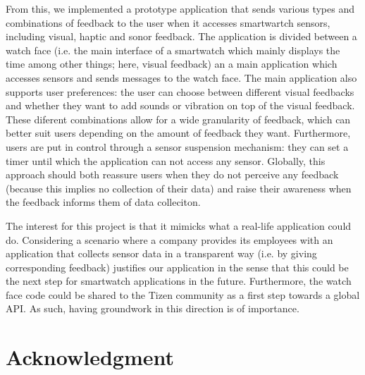 \documentclass[conference, a4paper, 10pt, twocolumn]{IEEEtran}
\begin{document}
From this, we implemented a prototype application that sends various types and combinations of feedback to the user when it accesses smartwartch sensors, including visual, haptic and sonor feedback. The application is divided between a watch face (i.e. the main interface of a smartwatch which mainly displays the time among other things; here, visual feedback) an a main application which accesses sensors and sends messages to the watch face. The main application also supports user preferences: the user can choose between different visual feedbacks and whether they want to add sounds or vibration on top of the visual feedback. These diferent combinations allow for a wide granularity of feedback, which can better suit users depending on the amount of feedback they want. Furthermore, users are put in control through a sensor suspension mechanism: they can set a timer until which the application can not access any sensor. Globally, this approach should both reassure users when they do not perceive any feedback (because this implies no collection of their data) and raise their awareness when the feedback informs them of data colleciton.  

The interest for this project is that it mimicks what a real-life application could do. Considering a scenario where a company provides its employees with an application that collects sensor data in a transparent way (i.e. by giving corresponding feedback) justifies our application in the sense that this could be the next step for smartwatch applications in the future. Furthermore, the watch face code could be shared to the Tizen community as a first step towards a global \ac{API}. As such, having groundwork in this direction is of importance.

\section*{Acknowledgment}

\printbibliography
\end{document}
